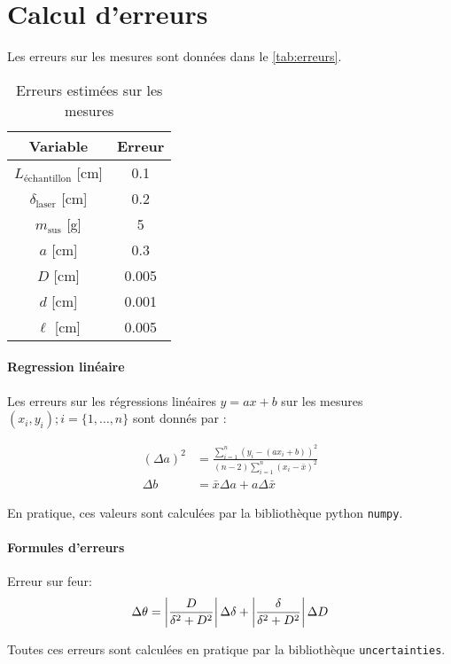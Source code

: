 \section{Calcul d'erreurs}
\label{sec:erreurs}

Les erreurs sur les mesures sont données dans le \autoref{tab:erreurs}.

\begin{table}[h]
    \centering
    \begin{tabulary}{\textwidth}{C C}
        \toprule
        Variable & Erreur \\
        \midrule
        \(L_\textrm{échantillon}\) [\si{\centi\meter}] & 0.1 \\
        \(\delta_\textrm{laser}\) [\si{\centi\meter}] & 0.2 \\
        \(m_\textrm{sus}\) [\si{\gram}] & 5 \\
        \(a\) [\si{\centi\metre}] & 0.3 \\
        \(D\) [\si{\centi\metre}] & 0.005 \\
        \(d\) [\si{\centi\meter}] & 0.001 \\
        \(\ell\) [\si{\centi\meter}] & 0.005 \\
        \bottomrule
    \end{tabulary}
    \caption{Erreurs estimées sur les mesures}
    \label{tab:erreurs}
\end{table}

\paragraph*{Regression linéaire}
Les erreurs sur les régressions linéaires \(y = ax + b\) sur les mesures \((x_i, y_i) ; i = \{1, \dots, n\}\) sont donnés par \cite{erreursmesure}:

\begin{equation}
    \label{eq:erreur:fit}
    \begin{aligned}
        (\Delta a)^2 &= \frac{\sum_{i=1}^{n}(y_i - (a x_i + b))^2}{(n-2) \sum_{i=1}^{n}(x_i - \bar{x})^2}\\
        \Delta b &= \bar{x} \Delta a + a \Delta \bar{x}
    \end{aligned}
\end{equation}

En pratique, ces valeurs sont calculées par la bibliothèque python \texttt{numpy}.

\paragraph*{Formules d'erreurs}

Erreur sur feur:
\begin{equation}
    \Delta \theta = \left|\frac{D}{\delta^2 + D^2}\right| \Delta \delta + \left|\frac{\delta}{\delta^2 + D^2}\right| \Delta D
\end{equation}

Toutes ces erreurs sont calculées en pratique par la bibliothèque \texttt{uncertainties}.

